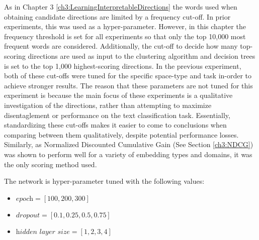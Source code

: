 As in Chapter 3 \ref{ch3:LearningInterpretableDirections} the words used when obtaining candidate directions are limited by a  frequency cut-off. In prior experiments, this was used as a  hyper-parameter. However, in this chapter the frequency threshold is set for all experiments so that only the   top 10,000 most frequent words are considered. Additionally, the cut-off to decide how many top-scoring directions are used as input to the clustering algorithm and decision trees is set to the top 1,000 highest-scoring directions. In the previous experiment, both of these cut-offs were tuned for the specific space-type and task in-order to achieve stronger results. The reason that these parameters are not tuned for this experiment is because the main focus of these experiments is a qualitative investigation of the directions, rather than attempting to maximize disentaglement or  performance on the text classification task. Essentially, standardizing these cut-offs makes it easier to come to conclusions when comparing between them qualitatively, despite potential performance losses. Similarly, as Normalized Discounted Cumulative Gain (See Section \ref{ch3:NDCG}) was shown to perform well for a variety of embedding types and domains, it was the only scoring method used.




The network is hyper-parameter tuned with the following values: 

\begin{itemize}
	\item $\textit{epoch} = [100, 200, 300]$
	\item $\textit{dropout} = [0.1, 0.25, 0.5, 0.75]$
	\item $\textit{hidden layer size} =[1,  2, 3, 4]$
\end{itemize}

